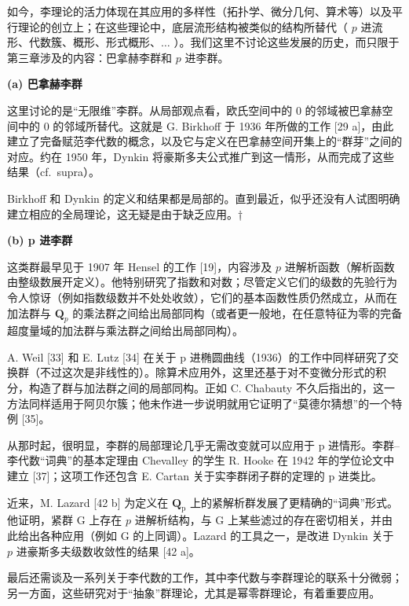 
如今，李理论的活力体现在其应用的多样性（拓扑学、微分几何、算术等）以及平行理论的创立上；在这些理论中，底层流形结构被类似的结构所替代（ \(p\) 进流形、代数簇、概形、形式概形、\(\ldots\) ）。我们这里不讨论这些发展的历史，而只限于第三章涉及的内容：巴拿赫李群和 \(p\) 进李群。

\textbf{(a) 巴拿赫李群}

这里讨论的是“无限维”李群。从局部观点看，欧氏空间中的 0 的邻域被巴拿赫空间中的 0 的邻域所替代。这就是 G. Birkhoff 于 1936 年所做的工作 {[}29 a{]}，由此建立了完备赋范李代数的概念，以及它与定义在巴拿赫空间开集上的“群芽”之间的对应。约在 1950 年，Dynkin 将豪斯多夫公式推广到这一情形，从而完成了这些结果（cf.~supra）。

Birkhoff 和 Dynkin 的定义和结果都是局部的。直到最近，似乎还没有人试图明确建立相应的全局理论，这无疑是由于缺乏应用。†

\textbf{(b) p 进李群}

这类群最早见于 1907 年 Hensel 的工作 {[}19{]}，内容涉及 \(p\) 进解析函数（解析函数由整级数展开定义）。他特别研究了指数和对数；尽管定义它们的级数的先验行为令人惊讶（例如指数级数并不处处收敛），它们的基本函数性质仍然成立，从而在加法群与 \(\mathbf{Q}_p\) 的乘法群之间给出局部同构（或者更一般地，在任意特征为零的完备超度量域的加法群与乘法群之间给出局部同构）。

A. Weil {[}33{]} 和 E. Lutz {[}34{]} 在关于 p 进椭圆曲线（1936）的工作中同样研究了交换群（不过这次是非线性的）。除算术应用外，这里还基于对不变微分形式的积分，构造了群与加法群之间的局部同构。正如 C. Chabauty 不久后指出的，这一方法同样适用于阿贝尔簇；他未作进一步说明就用它证明了“莫德尔猜想”的一个特例 {[}35{]}。

从那时起，很明显，李群的局部理论几乎无需改变就可以应用于 p 进情形。李群--李代数“词典”的基本定理由 Chevalley 的学生 R. Hooke 在 1942 年的学位论文中建立 {[}37{]}；这项工作还包含 E. Cartan 关于实李群闭子群的定理的 p 进类比。

近来，M. Lazard {[}42 b{]} 为定义在 \(\mathbf{Q}_{\mathrm{p}}\) 上的紧解析群发展了更精确的“词典”形式。他证明，紧群 G 上存在 \(p\) 进解析结构，与 G 上某些滤过的存在密切相关，并由此给出各种应用（例如 G 的上同调）。Lazard 的工具之一，是改进 Dynkin 关于 \(p\) 进豪斯多夫级数收敛性的结果 {[}42 a{]}。


最后还需谈及一系列关于李代数的工作，其中李代数与李群理论的联系十分微弱；另一方面，这些研究对于“抽象”群理论，尤其是幂零群理论，有着重要应用。

